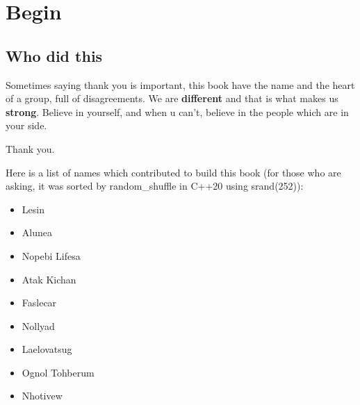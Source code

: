 \chapter{Begin}
    \section{Who did this}
    \tab Sometimes saying thank you is important, this book have the name and the heart of a group, full of disagreements. We are \textbf{different} and that is what makes us \textbf{strong}. Believe in yourself, and when u can't, believe in the people which are in your side.

    Thank you.

    Here is a list of names which contributed to build this book (for those who are asking, it was sorted by random\_shuffle  in C++20 using srand(252)):
    \begin{itemize}
        \item Lesin
        \item Alunea
        \item Nopebi Lifesa
        \item Atak Kichan
        \item Faslecar
        \item Nollyad
        \item Laelovatsug
        \item Ognol Tohberum
        \item Nhotivew
    \end{itemize}
